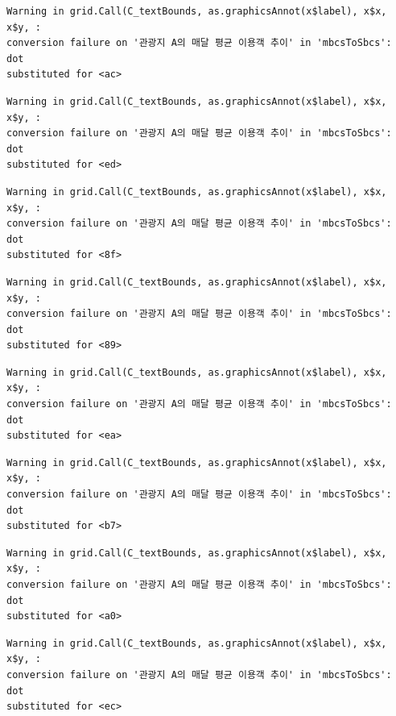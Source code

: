 \documentclass[
  letterpaper,
  DIV=11,
  numbers=noendperiod]{scrreprt}
\begin{document}
\begin{verbatim}
Warning in grid.Call(C_textBounds, as.graphicsAnnot(x$label), x$x, x$y, :
conversion failure on '관광지 A의 매달 평균 이용객 추이' in 'mbcsToSbcs': dot
substituted for <ac>
\end{verbatim}

\begin{verbatim}
Warning in grid.Call(C_textBounds, as.graphicsAnnot(x$label), x$x, x$y, :
conversion failure on '관광지 A의 매달 평균 이용객 추이' in 'mbcsToSbcs': dot
substituted for <ed>
\end{verbatim}

\begin{verbatim}
Warning in grid.Call(C_textBounds, as.graphicsAnnot(x$label), x$x, x$y, :
conversion failure on '관광지 A의 매달 평균 이용객 추이' in 'mbcsToSbcs': dot
substituted for <8f>
\end{verbatim}

\begin{verbatim}
Warning in grid.Call(C_textBounds, as.graphicsAnnot(x$label), x$x, x$y, :
conversion failure on '관광지 A의 매달 평균 이용객 추이' in 'mbcsToSbcs': dot
substituted for <89>
\end{verbatim}

\begin{verbatim}
Warning in grid.Call(C_textBounds, as.graphicsAnnot(x$label), x$x, x$y, :
conversion failure on '관광지 A의 매달 평균 이용객 추이' in 'mbcsToSbcs': dot
substituted for <ea>
\end{verbatim}

\begin{verbatim}
Warning in grid.Call(C_textBounds, as.graphicsAnnot(x$label), x$x, x$y, :
conversion failure on '관광지 A의 매달 평균 이용객 추이' in 'mbcsToSbcs': dot
substituted for <b7>
\end{verbatim}

\begin{verbatim}
Warning in grid.Call(C_textBounds, as.graphicsAnnot(x$label), x$x, x$y, :
conversion failure on '관광지 A의 매달 평균 이용객 추이' in 'mbcsToSbcs': dot
substituted for <a0>
\end{verbatim}

\begin{verbatim}
Warning in grid.Call(C_textBounds, as.graphicsAnnot(x$label), x$x, x$y, :
conversion failure on '관광지 A의 매달 평균 이용객 추이' in 'mbcsToSbcs': dot
substituted for <ec>
\end{verbatim}
\end{document}
